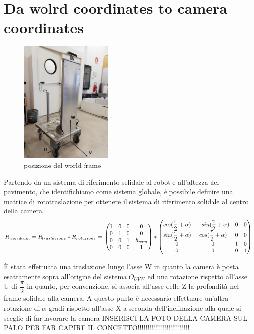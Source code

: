 \section{Da wolrd coordinates to camera coordinates}
\begin{figure}[H]
	\centering
	\includegraphics[width=0.4\textwidth]{Immagini/SupportoCamera_asse1.jpg}
	\caption{posizione del world frame}
	\label{fig:worldframe}
\end{figure}

Partendo da un sistema di riferimento solidale al robot e all'altezza del pavimento, che identifichiamo come sistema globale, è possibile definire una matrice di rototraslazione per ottenere il sistema di riferimento solidale al centro della camera.
\begin{equation*}
R_{worldcam} = R_{traslazione}*R_{rotazione} =\\
\begin{pmatrix}
1 & 0 & 0 & 0 \\
0 & 1 & 0 & 0 \\
0 & 0 & 1 & h_{cam} \\
0 & 0 & 0 & 1 \\
\end{pmatrix}*
\begin{pmatrix}
cos(\dfrac{\pi}{2}+\alpha) & -sin(\dfrac{\pi}{2}+\alpha) & 0 & 0 \\
sin(\dfrac{\pi}{2}+\alpha) & cos(\dfrac{\pi}{2}+\alpha)& 0 & 0 \\
0 & 0 & 1 & 0 \\
0 & 0 & 0 & 1 \\
\end{pmatrix}
\end{equation*}

È stata effettuata una traslazione lungo l'asse W in quanto la camera è posta esattamente sopra all'origine del sistema $O_{UVW}$ ed una rotazione rispetto all'asse U di $ \dfrac{\pi}{2}$ in quanto, per convenzione, si associa all'asse delle Z la profondità nel frame solidale alla camera.
A questo punto è necessario effettuare un'altra rotazione di $\alpha$ gradi rispetto all'asse X a seconda dell'inclinazione alla quale si sceglie di far lavorare la camera
INSERISCI LA FOTO DELLA CAMERA SUL PALO PER FAR CAPIRE IL CONCETTO!!!!!!!!!!!!!!!!!!!!!!!!!!!

